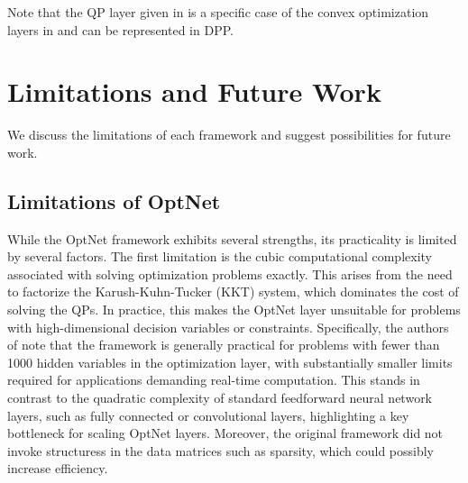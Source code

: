 \documentclass{article}
\begin{document}
Note that the QP layer given in \citet{optnet} is a specific case of the convex optimization layers in \citet{differentiableconvexoptimizationlayers} and can be represented in DPP.


\section{Limitations and Future Work}

We discuss the limitations of each framework and suggest possibilities for future work. 

\subsection{Limitations of OptNet}

While the OptNet framework exhibits several strengths, its practicality is limited by several factors. The first limitation is the cubic computational complexity associated with solving optimization problems exactly. This arises from the need to factorize the Karush-Kuhn-Tucker (KKT) system, which dominates the cost of solving the QPs. In practice, this makes the OptNet layer unsuitable for problems with high-dimensional decision variables or constraints. Specifically, the authors of \citet{optnet} note that the framework is generally practical for problems with fewer than 1000 hidden variables in the optimization layer, with substantially smaller limits required for applications demanding real-time computation. This stands in contrast to the quadratic complexity of standard feedforward neural network layers, such as fully connected or convolutional layers, highlighting a key bottleneck for scaling OptNet layers. Moreover, the original framework did not invoke structuress in the data matrices such as sparsity, which could possibly increase efficiency. 
\end{document}
